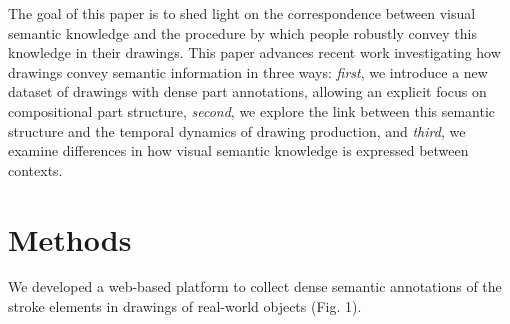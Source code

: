 \documentclass[10pt,letterpaper]{article}
\begin{document}

The goal of this paper is to shed light on the correspondence between visual semantic knowledge and the procedure by which people robustly convey this knowledge in their drawings.
This paper advances recent work \cite{FanCommon2018} investigating how drawings convey semantic information in three ways: 
\textit{first}, we introduce a new dataset of drawings with dense part annotations, allowing an explicit focus on compositional part structure,
\textit{second}, we explore the link between this semantic structure and the temporal dynamics of drawing production,
and \textit{third}, we examine differences in how visual semantic knowledge is expressed between contexts. 


\section{Methods}

We developed a web-based platform \cite{deLeeuw2015} to collect dense semantic annotations of the stroke elements in drawings of real-world objects (Fig. 1).
\end{document}
